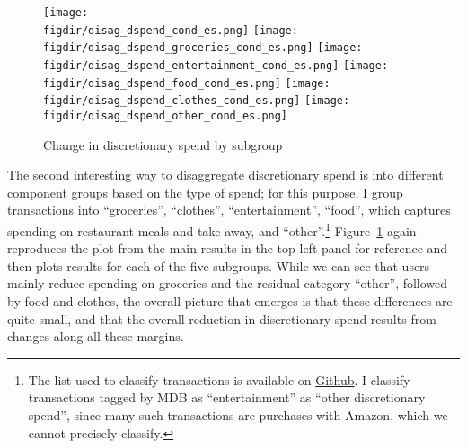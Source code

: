 \begin{figure}[h]
    \centering
    \caption{Change in discretionary spend by subgroup}%
    \label{fig:disagg_groups}
    \texttt{[image: \\figdir/disag\_dspend\_cond\_es.png]}
    \texttt{[image: \\figdir/disag\_dspend\_groceries\_cond\_es.png]}
    \texttt{[image: \\figdir/disag\_dspend\_entertainment\_cond\_es.png]}
    \texttt{[image: \\figdir/disag\_dspend\_food\_cond\_es.png]}
    \texttt{[image: \\figdir/disag\_dspend\_clothes\_cond\_es.png]}
    \texttt{[image: \\figdir/disag\_dspend\_other\_cond\_es.png]}
\end{figure}

The second interesting way to disaggregate discretionary spend is into
different component groups based on the type of spend; for this purpose, I
group transactions into ``groceries'', ``clothes'', ``entertainment'',
``food'', which captures spending on restaurant meals and take-away, and
``other''.\footnote{The list used to classify transactions is available on
    \href{https://github.com/fabiangunzinger/mdb_eval/blob/f31bfcd7a330188cdd27968d41957ebf5b454099/src/data/aggregators.py\#L389}{Github}.
    I classify transactions tagged by MDB as ``entertainment'' as ``other
discretionary spend'', since many such transactions are purchases with Amazon,
which we cannot precisely classify.} Figure~\ref{fig:disagg_groups} again
reproduces the plot from the main results in the top-left panel for reference
and then plots results for each of the five subgroups. While we can see that users
mainly reduce spending on groceries and the residual category ``other'',
followed by food and clothes, the overall picture that emerges is that these
differences are quite small, and that the overall reduction in discretionary
spend results from changes along all these margins.

